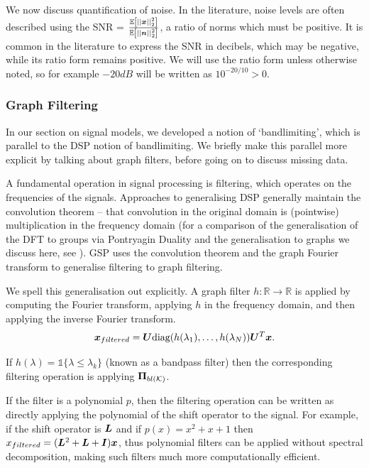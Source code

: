We now discuss quantification of noise. In the literature, noise levels are often described using the SNR = $\frac{\expect{\sqnormvec{ \vect{x} }}}{\expect{\sqnormvec{\vect{n}}}}$, a ratio of norms which must be positive. It is common in the literature to express the SNR in decibels, which may be negative, while its ratio form remains positive. We will use the ratio form unless otherwise noted, so for example $-20dB$ will be written as $10^{-20/10}  > 0$.

\subsubsection{Graph Filtering}
In our section on signal models, we developed a notion of `bandlimiting', which is parallel to the DSP notion of bandlimiting. We briefly make this parallel more explicit by talking about graph filters, before going on to discuss missing data.

A fundamental operation in signal processing is filtering, which operates on the frequencies of the signals. Approaches to generalising DSP generally maintain the convolution theorem -- that convolution in the original domain is (pointwise) multiplication in the frequency domain (for a comparison of the generalisation of the DFT to groups via Pontryagin Duality and the generalisation to graphs we discuss here, see \cite{ji2023faces}). GSP uses the convolution theorem and the graph Fourier transform to generalise filtering to graph filtering.

We spell this generalisation out explicitly. A graph filter $h: \mathbb{R} \to \mathbb{R}$ is applied by computing the Fourier transform, applying $h$ in the frequency domain, and then applying the inverse Fourier transform.
\begin{equation}
    \bm{x}_{filtered} = \bm{U}\text{diag}(h(\lambda_{1}),\ldots,h(\lambda_{N}))\bm{U}^{T}\bm{x}.
\end{equation}

If $h(\lambda) = \mathds{1}\{
\lambda \leq \lambda_{k} \}$ (known as a bandpass filter) then the corresponding filtering operation is applying $\projbl$.

If the filter is a polynomial $p$, then the filtering operation can be written as directly applying the polynomial of the shift operator to the signal. For example, if the shift operator is $\bm{L}$ and if $p(x) = x^{2} + x + 1$ then $x_{filtered} = (\bm{L}^{2} + \bm{L} + \bm{I})\bm{x}$, thus polynomial filters can be applied without spectral decomposition, making such filters much more computationally efficient.



